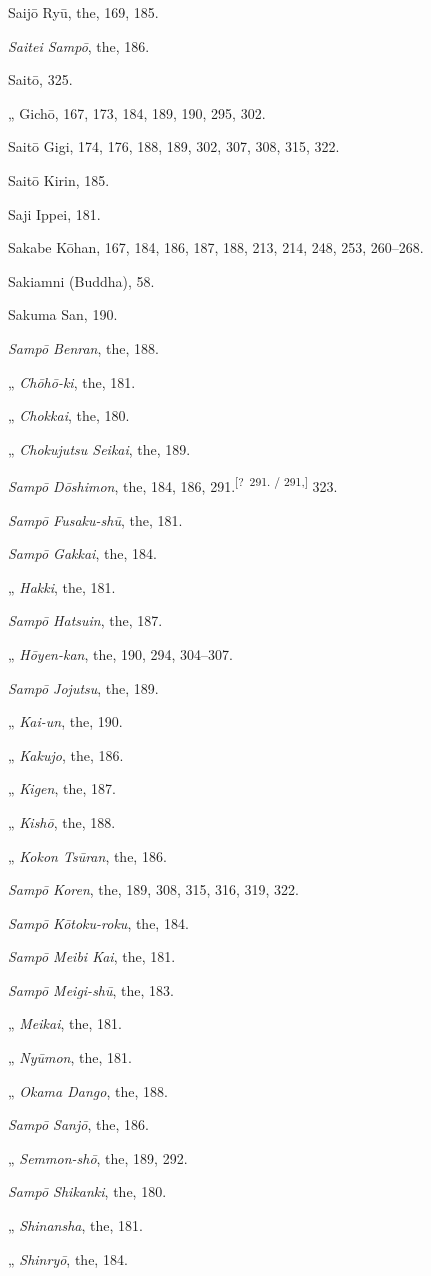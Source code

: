 \documentclass[11pt]{article}
\newcommand{\unclear}[1]{\textsuperscript{[?~#1]}}
\begin{document}
Saijō Ryū, the, 169, 185.\par
\emph{Saitei Sampō}, the, 186.\par
Saitō, 325.\par
\quad „ Gichō, 167, 173, 184, 189, 190, 295, 302.\par
Saitō Gigi, 174, 176, 188, 189, 302, 307, 308, 315, 322.\par
Saitō Kirin, 185.\par
Saji Ippei, 181.\par
Sakabe Kōhan, 167, 184, 186, 187, 188, 213, 214, 248, 253, 260--268.\par
Sakiamni (Buddha), 58.\par
Sakuma San, 190.\par
\emph{Sampō Benran}, the, 188.\par
\quad „ \emph{Chōhō-ki}, the, 181.\par
\quad „ \emph{Chokkai}, the, 180.\par
\quad „ \emph{Chokujutsu Seikai}, the, 189.\par
\emph{Sampō Dōshimon}, the, 184, 186, 291.\unclear{291. / 291,} 323.\par
\emph{Sampō Fusaku-shū}, the, 181.\par
\emph{Sampō Gakkai}, the, 184.\par
\quad „ \emph{Hakki}, the, 181.\par
\emph{Sampō Hatsuin}, the, 187.\par
\quad „ \emph{Hōyen-kan}, the, 190, 294, 304--307.\par
\emph{Sampō Jojutsu}, the, 189.\par
\quad „ \emph{Kai-un}, the, 190.\par
\quad „ \emph{Kakujo}, the, 186.\par
\quad „ \emph{Kigen}, the, 187.\par
\quad „ \emph{Kishō}, the, 188.\par
\quad „ \emph{Kokon Tsūran}, the, 186.\par
\emph{Sampō Koren}, the, 189, 308, 315, 316, 319, 322.\par
\emph{Sampō Kōtoku-roku}, the, 184.\par
\emph{Sampō Meibi Kai}, the, 181.\par
\emph{Sampō Meigi-shū}, the, 183.\par
\quad „ \emph{Meikai}, the, 181.\par
\quad „ \emph{Nyūmon}, the, 181.\par
\quad „ \emph{Okama Dango}, the, 188.\par
\emph{Sampō Sanjō}, the, 186.\par
\quad „ \emph{Semmon-shō}, the, 189, 292.\par
\emph{Sampō Shikanki}, the, 180.\par
\quad „ \emph{Shinansha}, the, 181.\par
\quad „ \emph{Shinryō}, the, 184.\par
\end{document}
